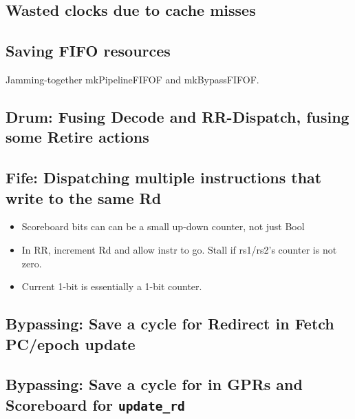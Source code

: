 
\subsection{Wasted clocks due to cache misses}


\subsection{Saving FIFO resources}

Jamming-together mkPipelineFIFOF and mkBypassFIFOF.


\subsection{Drum: Fusing Decode and RR-Dispatch, fusing some Retire actions}


\subsection{Fife: Dispatching multiple instructions that write to the same Rd}

\begin{itemize}
 \item Scoreboard bits can can be a small up-down counter, not just Bool
 \item In RR, increment Rd and allow instr to go. Stall if rs1/rs2's counter is not zero.
 \item Current 1-bit is essentially a 1-bit counter.
\end{itemize}


\subsection{Bypassing: Save a cycle for Redirect in Fetch PC/epoch update}


\subsection{Bypassing: Save a cycle for in GPRs and Scoreboard for {\tt update\_rd}}

